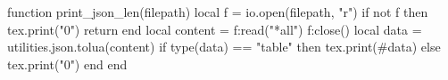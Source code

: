 \begin{luacode*}
function print_json_len(filepath)
    local f = io.open(filepath, "r")
    if not f then
        tex.print("0")
        return
    end
    local content = f:read("*all")
    f:close()
    local data = utilities.json.tolua(content)
    if type(data) == "table" then
        tex.print(#data)
    else
        tex.print("0")
    end
end
\end{luacode*}
\newcommand{\jsonlen}[1]{\directlua{print_json_len("\luaescapestring{\detokenize{#1}}")}}
